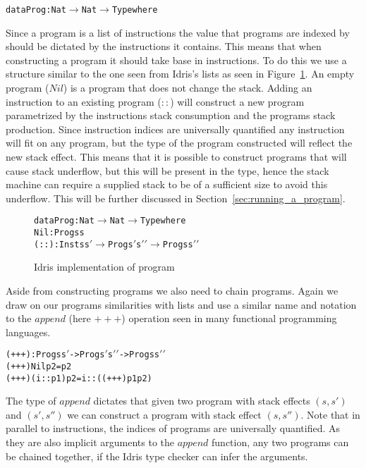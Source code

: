 \begin{alltt}
data Prog : Nat \(\rightarrow\)  Nat \(\rightarrow\)  Type where
\end{alltt}

Since a program is a list of instructions the value that programs are indexed by should be dictated by the instructions it contains. This means that when constructing a program it should take base in instructions. To do this we use a structure similar to the one seen from Idris's lists as seen in Figure~\ref{fig:idris_impl_of_prg}. An empty program ($Nil$) is a program that does not change the stack. Adding an instruction to an existing program ($::$) will construct a new program parametrized by the instructions stack consumption and the programs stack production. Since instruction indices are universally quantified any instruction will fit on any program, but the type of the program constructed will reflect the new stack effect. This means that it is possible to construct programs that will cause stack underflow, but this will be present in the type, hence the stack machine can require a supplied stack to be of a sufficient size to avoid this underflow. This will be further discussed in Section~\ref{sec:running_a_program}.

\begin{figure}
\begin{alltt}
data Prog : Nat \(\rightarrow\)  Nat \(\rightarrow\)  Type where
  Nil  : Prog s s
  (::) : Inst s s\('\) \(\rightarrow\)  Prog s\('\) s\('\)\('\) \(\rightarrow\)  Prog s s\('\)\('\)
\end{alltt}
\caption{Idris implementation of program}
\label{fig:idris_impl_of_prg}
\end{figure}

Aside from constructing programs we also need to chain programs. Again we draw on our programs similarities with lists and use a similar name and notation to the $append$ (here $+++$) operation seen in many functional programming languages.

\begin{alltt}
(+++) : Prog s s\('\) -> Prog s\('\) s\('\)\('\) -> Prog s s\('\)\('\)
(+++) Nil p2       = p2
(+++) (i :: p1) p2 = i :: ((+++) p1 p2)
\end{alltt}

The type of $append$ dictates that given two program with stack effects $(s, s')$ and $(s', s'')$ we can construct a program with stack effect $(s, s'')$. Note that in parallel to instructions, the indices of programs are universally quantified. As they are also implicit arguments to the $append$ function, any two programs can be chained together, if the Idris type checker can infer the arguments.